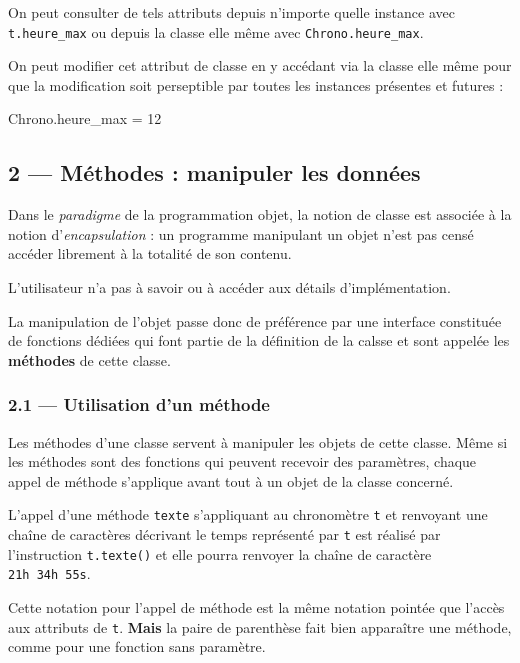 \documentclass[a4paper,17pt]{extarticle}
\newenvironment{Shaded}{}{}
\newcommand{\DecValTok}[1]{\textcolor[rgb]{0.25,0.63,0.44}{{#1}}}
\newcommand{\NormalTok}[1]{{#1}}
\newcommand{\OperatorTok}[1]{\textcolor[rgb]{0.40,0.40,0.40}{{#1}}}
\begin{document}
\begin{exemple}
On peut consulter de tels attributs depuis n'importe quelle instance
avec \texttt{t.heure\_max} ou depuis la classe elle même avec
\texttt{Chrono.heure\_max}.

On peut modifier cet attribut de classe en y accédant via la classe elle
même pour que la modification soit perseptible par toutes les instances
présentes et futures :

\begin{Shaded}
\begin{Highlighting}[]
\NormalTok{Chrono.heure\_max }\OperatorTok{=} \DecValTok{12}
\end{Highlighting}
\end{Shaded}

        \end{exemple}
    \hypertarget{muxe9thodes-manipuler-les-donnuxe9es}{%
\subsection{2 --- Méthodes : manipuler les
données}\label{muxe9thodes-manipuler-les-donnuxe9es}}

    Dans le \emph{paradigme} de la programmation objet, la notion de classe
est associée à la notion d'\emph{encapsulation} : un programme
manipulant un objet n'est pas censé accéder librement à la totalité de
son contenu.

L'utilisateur n'a pas à savoir ou à accéder aux détails
d'implémentation.

La manipulation de l'objet passe donc de préférence par une interface
constituée de fonctions dédiées qui font partie de la définition de la
calsse et sont appelée les \textbf{méthodes} de cette classe.

    \hypertarget{utilisation-dun-muxe9thode}{%
\subsubsection{2.1 --- Utilisation d'un
méthode}\label{utilisation-dun-muxe9thode}}

    Les méthodes d'une classe servent à manipuler les objets de cette
classe. Même si les méthodes sont des fonctions qui peuvent recevoir des
paramètres, chaque appel de méthode s'applique avant tout à un objet de
la classe concerné.
\begin{exemple}
    L'appel d'une méthode \texttt{texte} s'appliquant au chronomètre
\texttt{t} et renvoyant une chaîne de caractères décrivant le temps
représenté par \texttt{t} est réalisé par l'instruction
\texttt{t.texte()} et elle pourra renvoyer la chaîne de caractère
\texttt{\textquotesingle{}21h\ 34h\ 55s\textquotesingle{}}.

        \end{exemple}
    Cette notation pour l'appel de méthode est la même notation pointée que
l'accès aux attributs de \texttt{t}. \textbf{Mais} la paire de
parenthèse fait bien apparaître une méthode, comme pour une fonction
sans paramètre.
\end{document}
